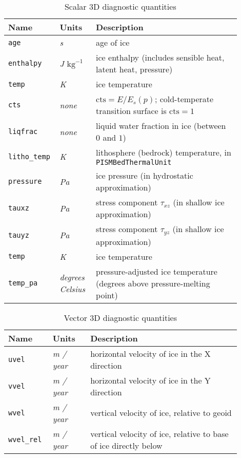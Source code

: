 \begin{table}[ht]
  \centering
  \begin{tabular}{p{0.15\linewidth}p{0.15\linewidth}p{0.6\linewidth}}
    \toprule
    \textbf{Name} & \textbf{Units} & \textbf{Description} \\
    \midrule
    \texttt{age} & \textsl{s} & age of ice \\
    \texttt{enthalpy} & \textsl{J $\mathrm{kg}^{-1}$} & ice enthalpy (includes sensible heat, latent heat, pressure) \\
    \texttt{temp} & \textsl{K} & ice temperature \\
    \texttt{cts} & \textsl{none} &  $\mathrm{cts} = E/E_s(p)$; cold-temperate transition surface is $\mathrm{cts} = 1$ \\
    \texttt{liqfrac} & \textsl{none} &  liquid water fraction in ice (between $0$ and $1$) \\
    \texttt{litho_temp} & \textsl{K} & lithosphere (bedrock) temperature, in \texttt{PISMBedThermalUnit} \\
    \texttt{pressure} & \textsl{Pa} &  ice pressure (in hydrostatic approximation) \\
    \texttt{tauxz} & \textsl{Pa} &  stress component $\tau_{xz}$ (in shallow ice approximation) \\
    \texttt{tauyz} & \textsl{Pa} &  stress component $\tau_{yz}$ (in shallow ice approximation) \\
    \texttt{temp} & \textsl{K} &  ice temperature \\
    \texttt{temp_pa} & \textsl{degrees Celsius} &  pressure-adjusted ice temperature (degrees above pressure-melting point) \\
    \bottomrule
  \end{tabular}
\caption{Scalar 3D diagnostic quantities}
\label{tab:three-d-diagnostics}
\end{table}

\begin{table}[ht]
  \centering
  \begin{tabular}{p{0.15\linewidth}p{0.15\linewidth}p{0.6\linewidth}}
    \toprule
    \textbf{Name} & \textbf{Units} & \textbf{Description} \\
    \midrule
    \texttt{uvel} & \textsl{m / year} &  horizontal velocity of ice in the X direction \\
    \texttt{vvel} & \textsl{m / year} &  horizontal velocity of ice in the Y direction \\
    \texttt{wvel} & \textsl{m / year} &  vertical velocity of ice, relative to geoid \\
    \texttt{wvel_rel} & \textsl{m / year} &  vertical velocity of ice, relative to base of ice directly below \\
    \bottomrule
  \end{tabular}
\caption{Vector 3D diagnostic quantities}
\label{tab:three-d-diagnostics-vector}
\end{table}


